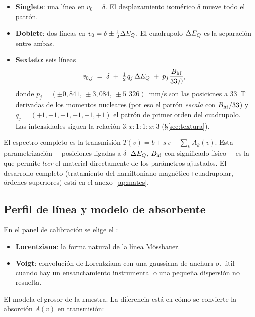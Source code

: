 \begin{itemize}[nosep]
  \item \textbf{Singlete}: una línea en $v_0 = \delta$. El desplazamiento
        isomérico $\delta$ mueve todo el patrón.
  \item \textbf{Doblete}: dos líneas en $v_0 = \delta \pm \tfrac{1}{2}\Delta E_{Q}$. El
        cuadrupolo $\Delta E_{Q}$ es la separación entre ambas.
  \item \textbf{Sexteto}: seis líneas
        \[
          v_{0,j} \;=\; \delta \;+\; \tfrac{1}{2}\,q_j\,\Delta E_{Q} \;+\;
          p_j\,\frac{B_{\mathrm{hf}}}{33{,}0},
        \]
        donde $p_j = (\pm0{,}841,\ \pm3{,}084,\ \pm5{,}326)$~mm/s son las
        posiciones a 33~T derivadas de los momentos nucleares (por eso el patrón
        \emph{escala} con $B_{\mathrm{hf}}/33$) y $q_j=(+1,-1,-1,-1,-1,+1)$ el patrón de
        primer orden del cuadrupolo. Las intensidades siguen la relación
        $3:x:1:1:x:3$ (§\ref{sec:textura}).
\end{itemize}

El espectro completo es la transmisión $T(v) = b + s\,v - \sum_k A_k(v)$. Esta
parametrización —posiciones ligadas a $\delta$, $\Delta E_{Q}$, $B_{\mathrm{hf}}$ con significado
físico— es la que permite \emph{leer} el material directamente de los parámetros
ajustados. El desarrollo completo (tratamiento del hamiltoniano
magnético+cuadrupolar, órdenes superiores) está en el anexo~\ref{ap:mates}.

\subsection{Perfil de línea y modelo de absorbente}

En el panel de calibración se elige el :

\begin{itemize}[nosep]
  \item \textbf{Lorentziana}: la forma natural de la línea Mössbauer.
  \item \textbf{Voigt}: convolución de Lorentziana con una gaussiana de anchura
        $\sigma$, útil cuando hay un ensanchamiento instrumental o una pequeña
        dispersión no resuelta.
\end{itemize}

El  modela el grosor de la muestra. La diferencia está en cómo
se convierte la absorción $A(v)$ en transmisión:

